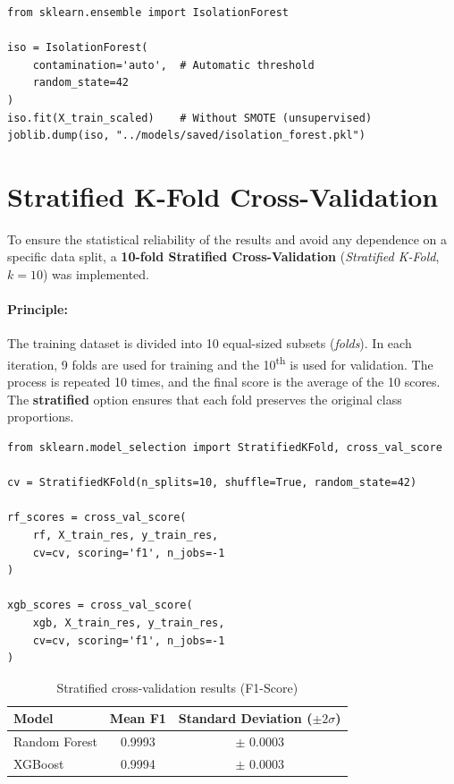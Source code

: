 \begin{lstlisting}[caption={Isolation Forest Training}]
from sklearn.ensemble import IsolationForest

iso = IsolationForest(
    contamination='auto',  # Automatic threshold
    random_state=42
)
iso.fit(X_train_scaled)    # Without SMOTE (unsupervised)
joblib.dump(iso, "../models/saved/isolation_forest.pkl")
\end{lstlisting}

\section{Stratified K-Fold Cross-Validation}

To ensure the statistical reliability of the results and avoid any dependence on a specific data split, a \textbf{10-fold Stratified Cross-Validation} (\textit{Stratified K-Fold}, $k=10$) was implemented.

\paragraph{Principle:} The training dataset is divided into 10 equal-sized subsets (\textit{folds}). In each iteration, 9 folds are used for training and the 10\textsuperscript{th} is used for validation. The process is repeated 10 times, and the final score is the average of the 10 scores. The \textbf{stratified} option ensures that each fold preserves the original class proportions.

\begin{lstlisting}[caption={10-Fold Stratified Cross-Validation}]
from sklearn.model_selection import StratifiedKFold, cross_val_score

cv = StratifiedKFold(n_splits=10, shuffle=True, random_state=42)

rf_scores = cross_val_score(
    rf, X_train_res, y_train_res,
    cv=cv, scoring='f1', n_jobs=-1
)

xgb_scores = cross_val_score(
    xgb, X_train_res, y_train_res,
    cv=cv, scoring='f1', n_jobs=-1
)
\end{lstlisting}

\begin{table}[H]
\centering
\caption{Stratified cross-validation results (F1-Score)}
\label{tab:cv_results}
\begin{tabular}{lcc}
\toprule
\textbf{Model} & \textbf{Mean F1} & \textbf{Standard Deviation ($\pm 2\sigma$)} \\
\midrule
Random Forest & 0.9993 & $\pm$ 0.0003 \\
XGBoost & 0.9994 & $\pm$ 0.0003 \\
\bottomrule
\end{tabular}
\end{table}

